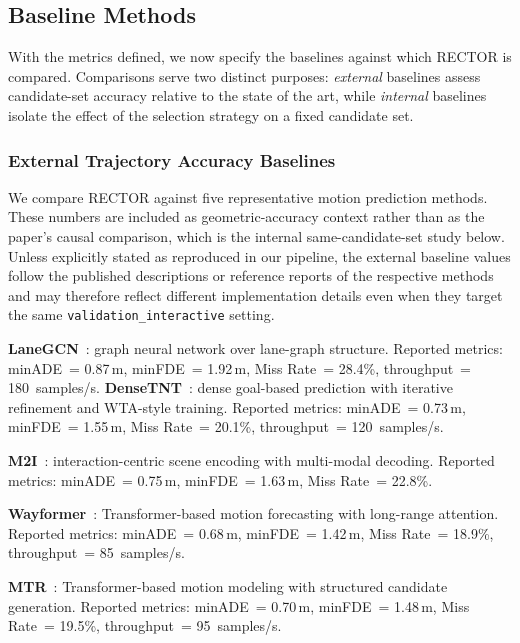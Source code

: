 \subsection{Baseline Methods}
\label{subsec:baseline_methods}

With the metrics defined, we now specify the baselines against which RECTOR is compared.  Comparisons serve two distinct purposes: \emph{external} baselines assess candidate-set accuracy relative to the state of the art, while \emph{internal} baselines isolate the effect of the selection strategy on a fixed candidate set.

\subsubsection{External Trajectory Accuracy Baselines}

We compare RECTOR against five representative motion prediction methods.  These numbers are included as geometric-accuracy context rather than as the paper's causal comparison, which is the internal same-candidate-set study below.  Unless explicitly stated as reproduced in our pipeline, the external baseline values follow the published descriptions or reference reports of the respective methods and may therefore reflect different implementation details even when they target the same \texttt{validation\_interactive} setting.

\textbf{LaneGCN}~\cite{liang2020lanegcn}: graph neural network over lane-graph structure.  Reported metrics: minADE~= 0.87\,m, minFDE~= 1.92\,m, Miss Rate~= 28.4\%, throughput~= 180~samples/s.  \textbf{DenseTNT}~\cite{gu2021densetnt}: dense goal-based prediction with iterative refinement and WTA-style training.  Reported metrics: minADE~= 0.73\,m, minFDE~= 1.55\,m, Miss Rate~= 20.1\%, throughput~= 120~samples/s.

\textbf{M2I}~\cite{Sun_2022}: interaction-centric scene encoding with multi-modal decoding.  Reported metrics: minADE~= 0.75\,m, minFDE~= 1.63\,m, Miss Rate~= 22.8\%.

\textbf{Wayformer}~\cite{nayakanti2023wayformer}: Transformer-based motion forecasting with long-range attention.  Reported metrics: minADE~= 0.68\,m, minFDE~= 1.42\,m, Miss Rate~= 18.9\%, throughput~= 85~samples/s.

\textbf{MTR}~\cite{shi2022motion}: Transformer-based motion modeling with structured candidate generation.  Reported metrics: minADE~= 0.70\,m, minFDE~= 1.48\,m, Miss Rate~= 19.5\%, throughput~= 95~samples/s.

